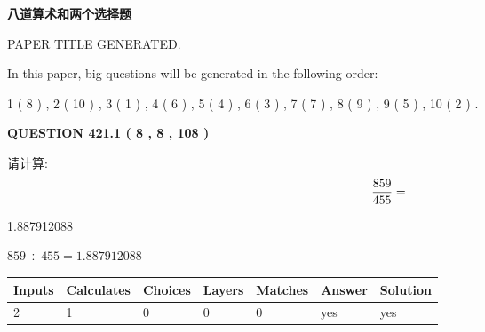 \documentclass{ctexart}
\begin{document}
   
\vspace{0.2in}
   
   
   
   
   
   
   
   
 \vspace{0.2in}
{\LARGE {\textbf{ 八道算术和两个选择题}}}
   
   
 PAPER TITLE GENERATED.
   
   
   
\vspace{0.2in}
   
In this paper, big questions will be generated in the following order: 
   
   
   1 ( 8 )
 ,
   2 ( 10 )
 ,
   3 ( 1 )
 ,
   4 ( 6 )
 ,
   5 ( 4 )
 ,
   6 ( 3 )
 ,
   7 ( 7 )
 ,
   8 ( 9 )
 ,
   9 ( 5 )
 ,
   10 ( 2 )
 .
  
\vspace{0.2in}
  
{\textbf{\Large{QUESTION
421.1 
 ( 8 , 8 , 108 )
}}}
  
  
 
请计算:
\begin{equation}
\frac { %
859 }  {  %
455} = \nonumber
\end{equation}
 
 
 
\noindent{}
 
 

1.887912088
 
 
\noindent{}
 
 

 
 
 
\noindent{}
 
 

$ %
859 \div  %
455=   %
1.887912088$
 
 
\noindent{}
 
 

 
   
   
   
   
\noindent\begin{tabular}{|l|l|l|l|l|l|l|}
 \hline
Inputs & Calculates & Choices & Layers & Matches & Answer & Solution \\ \hline
 2  & 
 1  & 
 0
  & 
 0  & 
 0  & 
  yes & 
  yes 
  \\ \hline
 \end{tabular}
   
\end{document}
